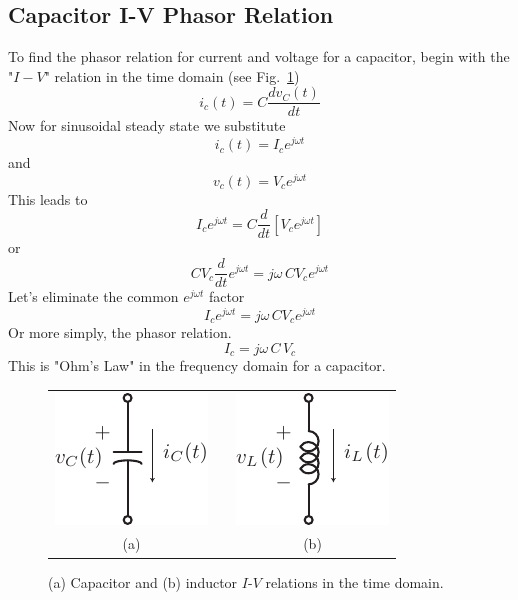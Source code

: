 \subsection{Capacitor I-V Phasor Relation}
To find the phasor relation for current and voltage for a capacitor, begin with the "$I-V$" relation in the time domain (see Fig.~\ref{fig:lcphasor})
    \begin{equation}
        {i_c}(t) = C\frac{{d{v_C}(t)}}{{dt}}
    \end{equation}
Now for sinusoidal steady state we substitute
    \begin{equation}
        {i_c}(t) = {I_c}{e^{j\omega t}}
    \end{equation}
and
    \begin{equation}
        {v_c}(t) = {V_c}{e^{j\omega t}}
    \end{equation}
This leads to
    \begin{equation}
        {I_c}{e^{j\omega t}} = C\frac{d}{{dt}}[{V_c}{e^{j\omega t}}]
    \end{equation}
or
    \begin{equation}
        C{V_c}\frac{d}{{dt}}{e^{j\omega t}} = j\omega \,C{V_c}{e^{j\omega t}}
    \end{equation}
Let's eliminate the common $e^{j\omega t}$ factor
    \begin{equation}
        {I_c}{e^{j\omega t}} = j\omega \,C{V_c}{e^{j\omega t}}
    \end{equation}
Or more simply, the phasor relation.  
    \begin{equation}
        {I_c} = j\omega \,C\,{V_c}
    \end{equation}
This is "Ohm's Law" in the frequency domain for a capacitor.
\begin{figure}[tb]
\centering
\begin{tabular}{ccc}
\includegraphics[width=.25\columnwidth]{mod1_3_3_cap} & \hspace{1cm} &
\includegraphics[width=.25\columnwidth]{mod1_3_4_ind}\\
(a) & & (b)\\
\end{tabular}
\caption{(a) Capacitor and (b) inductor  $I$-$V$ relations in the time domain.}
\label{fig:lcphasor}
\end{figure}
